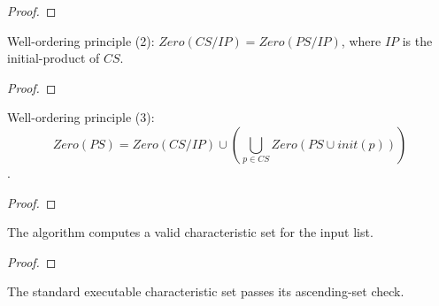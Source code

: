 \begin{proof}
    \leanok
\end{proof}

\begin{theorem}
    \label{thm:vanishingSet_diff_initialProd_eq}
    \leanok
    Well-ordering principle (2):
    $Zero(CS/IP) = Zero(PS/IP)$, where $IP$ is the initial-product of $CS$.
\end{theorem}

\begin{proof}
    \leanok
\end{proof}

\begin{theorem}
    \label{thm:vanishingSet_decomposition}
    \leanok
    Well-ordering principle (3):
    $$ Zero(PS) = Zero(CS/IP) \cup \left(\bigcup_{p \in CS} Zero(PS \cup {init(p)})\right) $$.
\end{theorem}

\begin{proof}
    \leanok
\end{proof}

\begin{theorem}
    \label{thm:characteristicSet_isCharacteristicSet}
    \leanok
    The algorithm computes a valid characteristic set for the input list.
\end{theorem}

\begin{proof}
    \leanok
\end{proof}

\begin{theorem}
    \label{thm:characteristicSet_isAscendingSet}
    \leanok
    The standard executable characteristic set passes its ascending-set check.
\end{theorem}

